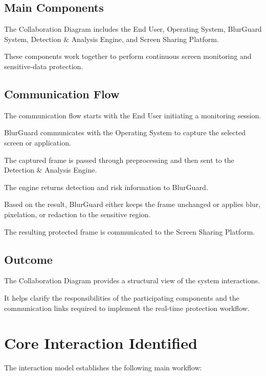 \documentclass[12pt,a4paper]{article}
\begin{document}
\subsection{Main Components}

The Collaboration Diagram includes the End User, Operating System, BlurGuard System, Detection \& Analysis Engine, and Screen Sharing Platform.

These components work together to perform continuous screen monitoring and sensitive-data protection.

\subsection{Communication Flow}

The communication flow starts with the End User initiating a monitoring session.

BlurGuard communicates with the Operating System to capture the selected screen or application.

The captured frame is passed through preprocessing and then sent to the Detection \& Analysis Engine.

The engine returns detection and risk information to BlurGuard.

Based on the result, BlurGuard either keeps the frame unchanged or applies blur, pixelation, or redaction to the sensitive region.

The resulting protected frame is communicated to the Screen Sharing Platform.

\subsection{Outcome}

The Collaboration Diagram provides a structural view of the system interactions.

It helps clarify the responsibilities of the participating components and the communication links required to implement the real-time protection workflow.



\section{Core Interaction Identified}

The interaction model establishes the following main workflow:
\end{document}
